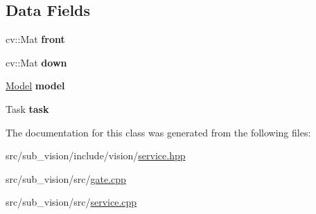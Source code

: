 \subsection*{Data Fields}
\begin{DoxyCompactItemize}
\item 
\mbox{\label{classVisionService_aab2728718c9697f322dc84914a670484}} 
cv\+::\+Mat {\bfseries front}
\item 
\mbox{\label{classVisionService_aea4889f5af8acdf4b6e222f67c58477b}} 
cv\+::\+Mat {\bfseries down}
\item 
\mbox{\label{classVisionService_aa0b7cb339423b293d576e69759a754bc}} 
\hyperlink{classModel}{Model} {\bfseries model}
\item 
\mbox{\label{classVisionService_a6089969c6dc3a41dc384b4963f6bd37a}} 
Task {\bfseries task}
\end{DoxyCompactItemize}


The documentation for this class was generated from the following files\+:\begin{DoxyCompactItemize}
\item 
src/sub\+\_\+vision/include/vision/\hyperlink{sub__vision_2include_2vision_2service_8hpp}{service.\+hpp}\item 
src/sub\+\_\+vision/src/\hyperlink{gate_8cpp}{gate.\+cpp}\item 
src/sub\+\_\+vision/src/\hyperlink{sub__vision_2src_2service_8cpp}{service.\+cpp}\end{DoxyCompactItemize}
